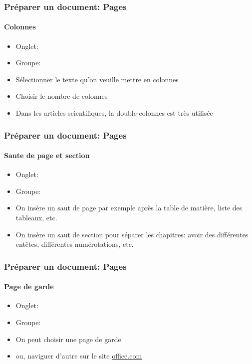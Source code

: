 \documentclass[xcolor=table]{beamer}
\begin{document}
\begin{frame}[t]
\frametitle{Préparer un document: Pages}
\framesubtitle{Colonnes}

\begin{minipage}{0.44\textwidth}
	\begin{itemize}
		\item Onglet: 
		\item Groupe: 
		\item Sélectionner le texte qu'on veuille mettre en colonnes
		\item Choisir le nombre de colonnes 
		\item Dans les articles scientifiques, la double-colonnes est très utilisée
	\end{itemize}
\end{minipage}
\begin{minipage}{0.55\textwidth}
\end{minipage}

\end{frame}

\begin{frame}[t]
\frametitle{Préparer un document: Pages}
\framesubtitle{Saute de page et section}

\begin{minipage}{0.44\textwidth}
	\begin{itemize}
		\item Onglet: 
		\item Groupe: 
		\item On insère un saut de page par exemple après la table de matière, liste des tableaux, etc.
		\item On insère un saut de section pour séparer les chapitres: avoir des différentes entêtes, différentes numérotations, etc.
	\end{itemize}
\end{minipage}
\begin{minipage}{0.55\textwidth}
\end{minipage}

\end{frame}

\begin{frame}[t]
\frametitle{Préparer un document: Pages}
\framesubtitle{Page de garde}

\begin{minipage}{0.49\textwidth}
	\begin{itemize}
		\item Onglet: 
		\item Groupe: 
		\item On peut choisir une page de garde
		\item ou, naviguer d'autre sur le site \url{office.com}
	\end{itemize}
\end{minipage}
\begin{minipage}{0.50\textwidth}
\end{minipage}

\end{frame}
\end{document}
